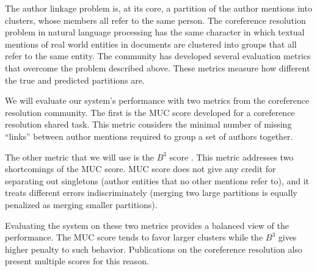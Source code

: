 \documentclass[twocolumn,letterpaper]{article}
\begin{document}
The author linkage problem is, at its core, a partition of the author
mentions into clusters, whose members all refer to the same person.
The coreference resolution problem in natural language processing has
the same character in which textual mentions of real world entities in
documents are clustered into groups that all refer to the same entity.
The community has developed several evaluation metrics that overcome
the problem described above.  These metrics measure how different the
true and predicted partitions are.

We will evaluate our system's performance with two metrics from the
coreference resolution community.  The first is the MUC score
\cite{Vilain95} developed for a coreference resolution shared task.
This metric considers the minimal number of missing ``links'' between
author mentions required to group a set of authors together.

The other metric that we will use is the $B^3$ score \cite{Bagga98b}.
This metric addresses two shortcomings of the MUC score.  MUC score
does not give any credit for separating out singletons (author
entities that no other mentions refer to), and it treats different
errors indiscriminately (merging two large partitions is equally
penalized as merging smaller partitions).

Evaluating the system on these two metrics provides a balanced view of
the performance.  The MUC score tends to favor larger clusters while
the $B^3$ gives higher penalty to such behavior.  Publications on the
coreference resolution also present multiple scores for this reason.



\end{document}
